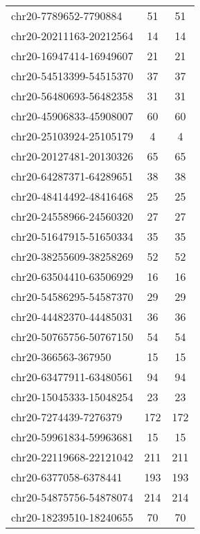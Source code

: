 \begin{longtable}{lSS}
	chr20-7789652-7790884   & 51     & 51                                        \\
	chr20-20211163-20212564 & 14     & 14                                        \\
	chr20-16947414-16949607 & 21     & 21                                        \\
	chr20-54513399-54515370 & 37     & 37                                        \\
	chr20-56480693-56482358 & 31     & 31                                        \\
	chr20-45906833-45908007 & 60     & 60                                        \\
	chr20-25103924-25105179 & 4      & 4                                         \\
	chr20-20127481-20130326 & 65     & 65                                        \\
	chr20-64287371-64289651 & 38     & 38                                        \\
	chr20-48414492-48416468 & 25     & 25                                        \\
	chr20-24558966-24560320 & 27     & 27                                        \\
	chr20-51647915-51650334 & 35     & 35                                        \\
	chr20-38255609-38258269 & 52     & 52                                        \\
	chr20-63504410-63506929 & 16     & 16                                        \\
	chr20-54586295-54587370 & 29     & 29                                        \\
	chr20-44482370-44485031 & 36     & 36                                        \\
	chr20-50765756-50767150 & 54     & 54                                        \\
	chr20-366563-367950     & 15     & 15                                        \\
	chr20-63477911-63480561 & 94     & 94                                        \\
	chr20-15045333-15048254 & 23     & 23                                        \\
	chr20-7274439-7276379   & 172    & 172                                       \\
	chr20-59961834-59963681 & 15     & 15                                        \\
	chr20-22119668-22121042 & 211    & 211                                       \\
	chr20-6377058-6378441   & 193    & 193                                       \\
	chr20-54875756-54878074 & 214    & 214                                       \\
	chr20-18239510-18240655 & 70     & 70                                        \\
\end{longtable}
